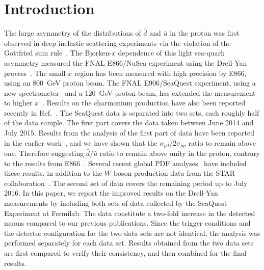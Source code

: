 \documentclass[reprint,aps,unsortedaddress,superscriptaddress,prl,floatfix,showpacs,linenumbers,final]{revtex4-2}
\begin{document}
\section{Introduction}
The large asymmetry of the distributions of $\bar{d}$ and $\bar{u}$ in the proton was first observed in deep inelastic
scattering experiments via the violation of the Gottfried sum rule~\cite{amaudruz1991}. 
The Bjorken-$x$ dependence of this light sea-quark asymmetry measured the FNAL E866/NuSea
experiment using the Drell-Yan process~\cite{towell2001}.
The small-$x$ region has been measured with high precision by E866,
using an \SI{800}{\GeV} proton beam. 
The FNAL E906/SeaQuest experiment, using a new spectrometer~\cite{aidala2019} and a \SI{120}{\GeV}
proton beam, has extended the measurement to higher $x$~\cite{dove2021,dove2023}. 
Results on the charmonium production have also been reported recently in Ref.~\cite{leung2024a}.
The SeaQuest data is separated into two sets, each roughly half of the data sample.
The first part covers the data taken between June 2014 and July 2015.
Results from the analysis of the first part of data have been reported in the earlier work~\cite{dove2021,dove2023}, 
and we have shown that the $\sigma_{pd}/2\sigma_{pp}$ ratio to remain above one.
Therefore suggesting $\bar{d}/\bar{u}$ ratio to remain above unity in the proton,
contrary to the results from E866~\cite{towell2001}.
Several recent global PDF analyses~\cite{cocuzza2021,ball2022a,accardi2023,alekhin2023}
have included these results, in addition to the $W$ boson production data from the STAR collaboration~\cite{adam2021}.
The second set of data covers the remaining period up to July 2016.
In this paper, we report the improved results on the Drell-Yan measurements
by including both sets of data collected by the SeaQuest Experiment at Fermilab.
The data constitute a two-fold increase in the detected muons compared to our previous publications.
Since the trigger
conditions and the detector configuration for the two data sets are not
identical, the analysis was performed separately for each data set. 
Results obtained from the two data sets are first compared to verify their
consistency, and then combined for the final results.
\end{document}
